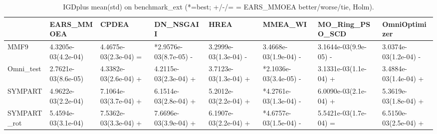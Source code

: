 \begin{table}[t]
\centering
\caption{IGDplus mean(std) on benchmark_ext (*=best; +/-/= = EARS_MMOEA better/worse/tie, Holm).}
\label{tab:benchmark_ext_IGDplus}
\begin{tabular}{llllllll}
\toprule
 & EARS\_MMOEA & CPDEA & DN\_NSGAII & HREA & MMEA\_WI & MO\_Ring\_PSO\_SCD & OmniOptimizer \\
\midrule
MMF9 & 4.3205e-03(4.2e-04) & 4.4675e-03(2.3e-04) = & *2.9576e-03(8.7e-05) - & 3.2999e-03(1.3e-04) - & 3.4668e-03(1.9e-04) - & 3.1644e-03(9.9e-05) - & 3.0374e-03(1.2e-04) - \\
Omni\_test & 2.7621e-03(8.6e-05) & 4.3382e-03(2.6e-04) + & 4.2115e-03(2.3e-04) + & 3.7123e-03(1.3e-04) + & *2.1036e-03(3.4e-05) - & 3.1331e-03(1.1e-04) + & 3.4884e-03(1.4e-04) + \\
SYMPART & 4.9622e-03(2.2e-04) & 7.1064e-03(3.7e-04) + & 6.1514e-03(2.8e-04) + & 5.2012e-03(2.2e-04) + & *4.2761e-03(1.3e-04) - & 6.0090e-03(2.1e-04) + & 5.3619e-03(1.8e-04) + \\
SYMPART\_rot & 5.4594e-03(3.1e-04) & 7.5362e-03(3.3e-04) + & 7.6696e-03(3.9e-04) + & 6.1907e-03(2.2e-04) + & *4.6757e-03(1.5e-04) - & 5.5421e-03(1.7e-04) = & 6.5150e-03(2.5e-04) + \\
\bottomrule
\end{tabular}
\end{table}
